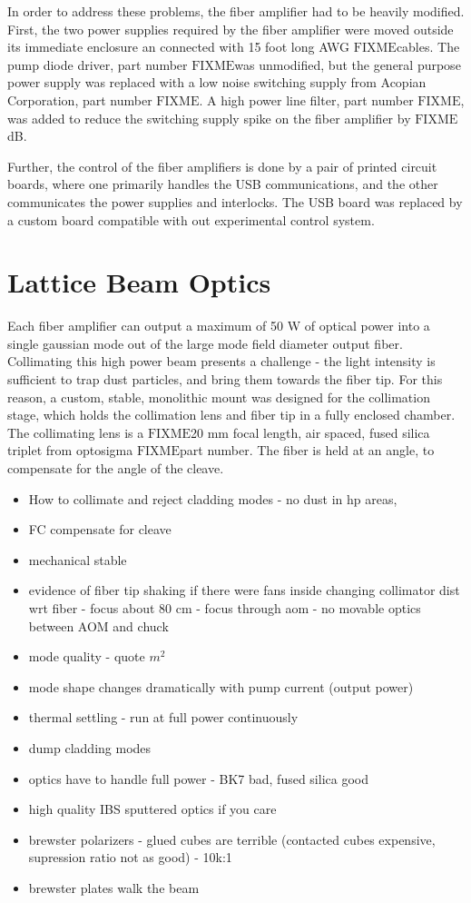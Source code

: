 \documentclass[twocolumn,aps,pra,showpacs,preprintnumbers,bibnotes]{revtex4-1}
\newcommand\FIXME{{\color{red}\ensuremath{\mathrm{FIXME}}}}
\begin{document}
In order to address these problems, the fiber amplifier had to be heavily modified. First, the two power supplies required by the fiber amplifier were moved outside its immediate enclosure an connected with 15 foot long AWG \FIXME cables. The pump diode driver, part number \FIXME was unmodified, but the general purpose power supply was replaced with a low noise switching supply from Acopian Corporation, part number \FIXME. A high power line filter, part number \FIXME, was added to reduce the switching supply spike on the fiber amplifier by \FIXME dB.

Further, the control of the fiber amplifiers is done by a pair of printed circuit boards, where one primarily handles the USB communications, and the other communicates the power supplies and interlocks. The USB board was replaced by a custom board compatible with out experimental control system.

\section{Lattice Beam Optics}
Each fiber amplifier can output a maximum of 50 W of optical power into a single gaussian mode out of the large mode field diameter output fiber. Collimating this high power beam presents a challenge - the light intensity is sufficient to trap dust particles, and bring them towards the fiber tip. For this reason, a custom, stable, monolithic mount was designed for the collimation stage, which holds the collimation lens and fiber tip in a fully enclosed chamber. The collimating lens is a \FIXME 20 mm focal length, air spaced, fused silica triplet from optosigma \FIXME part number. The fiber is held at an angle, to compensate for the angle of the cleave.




\begin{itemize}
\item How to collimate and reject cladding modes - no dust in hp areas, 
\item FC compensate for cleave
\item mechanical stable

\item evidence of fiber tip shaking if there were fans inside
changing collimator dist wrt fiber - focus about 80 cm - focus through aom - no movable optics between AOM and chuck
\item mode quality - quote $m^2$
\item mode shape changes dramatically with pump current (output power)
\item thermal settling - run at full power continuously
\item dump cladding modes
\item optics have to handle full power - BK7 bad, fused silica good
\item high quality IBS sputtered optics if you care
\item brewster polarizers - glued cubes are terrible (contacted cubes expensive, supression ratio not as good) - 10k:1
\item brewster plates walk the beam
\end{itemize}
\end{document}
